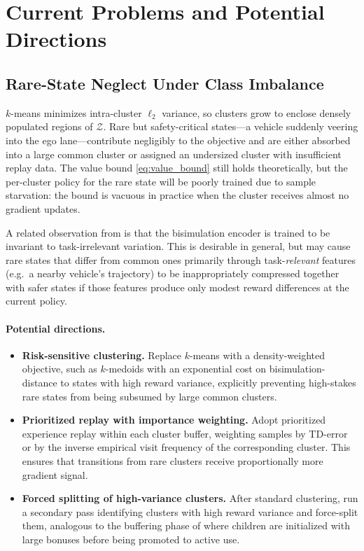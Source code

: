 \documentclass{article}
\begin{document}
\section{Current Problems and Potential Directions}

\subsection{Rare-State Neglect Under Class Imbalance}

$k$-means minimizes intra-cluster $\ell_2$ variance, so clusters grow to enclose
densely populated regions of $\mathcal{Z}$. Rare but safety-critical states---a
vehicle suddenly veering into the ego lane---contribute negligibly to the objective
and are either absorbed into a large common cluster or assigned an undersized cluster
with insufficient replay data. The value bound \eqref{eq:value_bound} still holds
theoretically, but the per-cluster policy for the rare state will be poorly trained
due to sample starvation: the bound is vacuous in practice when the cluster receives
almost no gradient updates.

A related observation from \citet{zhang2021} is that the bisimulation encoder is
trained to be invariant to task-irrelevant variation. This is desirable in general,
but may cause rare states that differ from common ones primarily through
task-\emph{relevant} features (e.g.\ a nearby vehicle's trajectory) to be
inappropriately compressed together with safer states if those features produce only
modest reward differences at the current policy.

\paragraph{Potential directions.}
\begin{itemize}[noitemsep]
  \item \textbf{Risk-sensitive clustering.} Replace $k$-means with a
    density-weighted objective, such as $k$-medoids with an exponential cost
    on bisimulation-distance to states with high reward variance, explicitly
    preventing high-stakes rare states from being subsumed by large common clusters.
  \item \textbf{Prioritized replay with importance weighting.} Adopt prioritized
    experience replay within each cluster buffer, weighting samples by TD-error or
    by the inverse empirical visit frequency of the corresponding cluster. This
    ensures that transitions from rare clusters receive proportionally more gradient
    signal.
  \item \textbf{Forced splitting of high-variance clusters.} After standard
    clustering, run a secondary pass identifying clusters with high reward
    variance and force-split them, analogous to the buffering phase of
    \citet{cao2021} where children are initialized with large bonuses before being
    promoted to active use.
\end{itemize}
\end{document}
